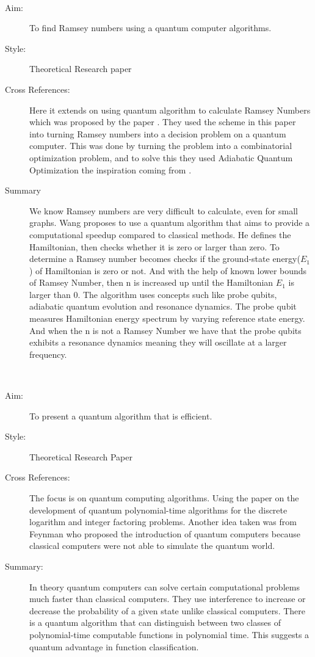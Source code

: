 \documentclass{Assignment}
\begin{document}
	\newpage
\cite{PhysRevA.93.032301}~
\begin{description}
	\item [Aim:]
	To find Ramsey numbers using a quantum computer algorithms.
	\item [Style:]
	Theoretical Research paper
	\item [Cross References:]
	Here it  extends on using quantum algorithm to calculate Ramsey Numbers which was proposed by the paper \cite{gaitan2012ramsey}.
	They used the scheme in this paper into turning Ramsey numbers into a decision problem on a quantum computer.
	This was done by turning the problem into a combinatorial optimization problem, and to solve this they used Adiabatic Quantum Optimization the inspiration coming from \cite{farhi2000quantum}.
	
	\item [Summary]
	We know Ramsey numbers are very difficult to calculate, even for small graphs.
	Wang proposes to use a quantum algorithm that aims to provide a computational speedup compared to classical methods.
	He defines the Hamiltonian, then checks whether it is zero or larger than zero.
	To determine a Ramsey number becomes checks if the ground-state energy($E_1$) of Hamiltonian is zero or not. 
	And with the help of known lower bounds of Ramsey Number, then n is increased up until the Hamiltonian $E_1$ is larger than 0.
	The algorithm uses concepts such like probe qubits, adiabatic quantum evolution and resonance dynamics. 
	The probe qubit measures Hamiltonian energy spectrum by varying reference state energy. 
	And when the n is not a Ramsey Number we have that the probe qubits exhibits a resonance dynamics meaning they will oscillate at a larger frequency.
\end{description}


\newpage
\cite{doi:10.1137/S0097539796298637}~
\begin{description}
	\item[Aim:]
	To present a quantum algorithm that is efficient.
	
	\item [Style:]
	Theoretical Research Paper
	\item [Cross References:]
	The focus is on quantum computing algorithms.
	Using the paper \cite{shor1994algorithms} on the development of quantum polynomial-time algorithms for the discrete logarithm and integer factoring problems.
	Another idea taken was from Feynman who proposed the introduction of quantum computers because classical computers were not able to simulate the quantum world.
	
	
	\item[Summary:]
	 In theory quantum computers can solve certain computational problems much faster than classical computers.
	They use interference to increase or decrease the probability of a given state unlike classical computers.
	There is a quantum algorithm that can distinguish between two classes of polynomial-time computable functions in polynomial time. 
	This suggests a quantum advantage in function classification. 
\end{description}
\end{document}
